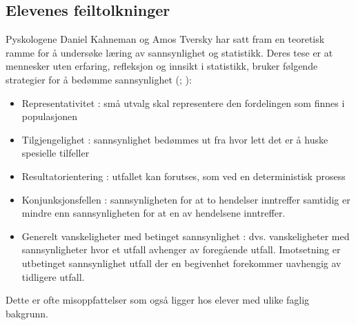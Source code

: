 \documentclass[main.tex]{subfiles}
\begin{document}
\subsection*{Elevenes feiltolkninger}
Pyskologene Daniel Kahneman og Amos Tversky har satt fram en teoretisk 
ramme for å undersøke læring av sannsynlighet og statistikk. Deres tese er at mennesker uten erfaring, refleksjon og 
innsikt i statistikk, bruker følgende strategier for å bedømme sannsynlighet (; ):
\begin{itemize}
\item Representativitet : små utvalg skal representere den fordelingen som finnes i populasjonen
\item Tilgjengelighet : sannsynlighet bedømmes ut fra hvor lett det er å huske spesielle tilfeller
\item Resultatorientering : utfallet kan forutses, som ved en deterministisk prosess
\item Konjunksjonsfellen : sannsynligheten for at to hendelser inntreffer samtidig er mindre enn sannsynligheten
for at en av hendelsene inntreffer.
\item Generelt vanskeligheter med betinget sannsynlighet : dvs. vanskeligheter med sannsynligheter hvor et utfall
avhenger av foregående utfall. Imotsetning er utbetinget sannsynlighet utfall der en begivenhet forekommer uavhengig 
av tidligere utfall. 
\end{itemize}
Dette er ofte misoppfattelser som også ligger hos elever med ulike faglig bakgrunn.
\end{document}
